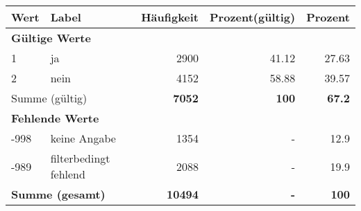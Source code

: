     \begin{longtable}{lXrrr}
     \toprule
     \textbf{Wert} & \textbf{Label} & \textbf{Häufigkeit} & \textbf{Prozent(gültig)} & \textbf{Prozent} \\
     \endhead
     \midrule
     \multicolumn{5}{l}{\textbf{Gültige Werte}}\\

     1 &
     \multicolumn{1}{X}{ ja   } &


       \num{2900} &
       \num[round-mode=places,round-precision=2]{41.12} &
         \num[round-mode=places,round-precision=2]{27.63} \\

     2 &
     \multicolumn{1}{X}{ nein   } &


       \num{4152} &
       \num[round-mode=places,round-precision=2]{58.88} &
         \num[round-mode=places,round-precision=2]{39.57} \\
     \midrule
     \multicolumn{2}{l}{Summe (gültig)} &
       \textbf{\num{7052}} &
     \textbf{\num{100}} &
       \textbf{\num[round-mode=places,round-precision=2]{67.2}} \\
     \multicolumn{5}{l}{\textbf{Fehlende Werte}}\\
       -998 &
       keine Angabe &
         \num{1354} &
        - &
         \num[round-mode=places,round-precision=2]{12.9} \\
       -989 &
       filterbedingt fehlend &
         \num{2088} &
        - &
         \num[round-mode=places,round-precision=2]{19.9} \\
     \midrule
     \multicolumn{2}{l}{\textbf{Summe (gesamt)}} &
          \textbf{\num{10494}} &
        \textbf{-} &
        \textbf{\num{100}} \\
     \bottomrule
     \end{longtable}
     
